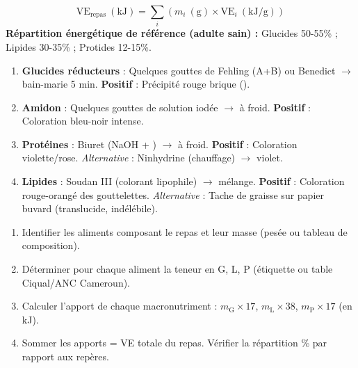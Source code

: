 \documentclass[11pt]{article}
\newcommand{\cle}[1]{{\popxbold\color{popdark}#1}}
\newcounter{popsec}
\newcounter{popsub}
\newcommand{\courssub}[1]{%
  \stepcounter{popsub}%
  \par\vspace{9pt}\noindent{\popxbold\fontsize{11.5}{13}\selectfont\color{popink}{\color{poporange}\thepopsec.\thepopsub}\hspace{6pt}#1}\par\nopagebreak\vspace{4pt}
}
\begin{document}
\begin{bilan}
\[
\boxed{\text{VE}_{\text{repas}}\ (\text{kJ}) = \sum_{i} \left( m_i\ (\text{g}) \times \text{VE}_i\ (\text{kJ/g}) \right)}
\]
\textbf{Répartition énergétique de référence (adulte sain) :} Glucides 50-55\% ; Lipides 30-35\% ; Protides 12-15\%.

\courssub{Méthodes express}

\begin{methode}
  \begin{enumerate}
    \item \textbf{Glucides réducteurs} : Quelques gouttes de \cle{Fehling} (A+B) ou \cle{Benedict} $\rightarrow$ bain-marie 5 min. \textbf{Positif} : Précipité rouge brique ().
    \item \textbf{Amidon} : Quelques gouttes de \cle{solution iodée} $\rightarrow$ à froid. \textbf{Positif} : Coloration bleu-noir intense.
    \item \textbf{Protéines} : \cle{Biuret} (NaOH + ) $\rightarrow$ à froid. \textbf{Positif} : Coloration violette/rose. \textit{Alternative} : Ninhydrine (chauffage) $\rightarrow$ violet.
    \item \textbf{Lipides} : \cle{Soudan III} (colorant lipophile) $\rightarrow$ mélange. \textbf{Positif} : Coloration rouge-orangé des gouttelettes. \textit{Alternative} : Tache de graisse sur papier buvard (translucide, indélébile).
  \end{enumerate}
\end{methode}

\begin{methode}
  \begin{enumerate}
    \item Identifier les aliments composant le repas et leur masse (pesée ou tableau de composition).
    \item Déterminer pour chaque aliment la teneur en G, L, P (étiquette ou table Ciqual/ANC Cameroun).
    \item Calculer l'apport de chaque macronutriment : $m_{\text{G}} \times 17$, $m_{\text{L}} \times 38$, $m_{\text{P}} \times 17$ (en kJ).
    \item Sommer les apports = VE totale du repas. Vérifier la répartition \% par rapport aux repères.
  \end{enumerate}
\end{methode}


\end{bilan}
\end{document}
